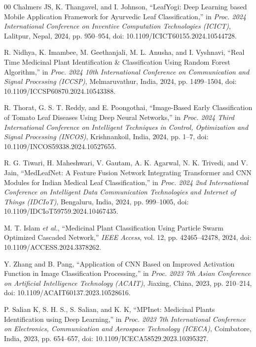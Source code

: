 \documentclass[conference]{IEEEtran}
\begin{document}
\begin{thebibliography}{00}
Chalmers JS, K. Thangavel, and I. Johnson, ``LeafYogi: Deep Learning based Mobile Application Framework for Ayurvedic Leaf Classification,'' in \textit{Proc. 2024 International Conference on Inventive Computation Technologies (ICICT)}, Lalitpur, Nepal, 2024, pp. 950--954, doi: 10.1109/ICICT60155.2024.10544728.

R. Nidhya, K. Imambee, M. Geethanjali, M. L. Anusha, and I. Vyshnavi, ``Real Time Medicinal Plant Identification \& Classification Using Random Forest Algorithm,'' in \textit{Proc. 2024 10th International Conference on Communication and Signal Processing (ICCSP)}, Melmaruvathur, India, 2024, pp. 1499--1504, doi: 10.1109/ICCSP60870.2024.10543388.

R. Thorat, G. S. T. Reddy, and E. Poongothai, ``Image-Based Early Classification of Tomato Leaf Diseases Using Deep Neural Networks,'' in \textit{Proc. 2024 Third International Conference on Intelligent Techniques in Control, Optimization and Signal Processing (INCOS)}, Krishnankoil, India, 2024, pp. 1--7, doi: 10.1109/INCOS59338.2024.10527655.

R. G. Tiwari, H. Maheshwari, V. Gautam, A. K. Agarwal, N. K. Trivedi, and V. Jain, ``MedLeafNet: A Feature Fusion Network Integrating Transformer and CNN Modules for Indian Medical Leaf Classification,'' in \textit{Proc. 2024 2nd International Conference on Intelligent Data Communication Technologies and Internet of Things (IDCIoT)}, Bengaluru, India, 2024, pp. 999--1005, doi: 10.1109/IDCIoT59759.2024.10467435.

M. T. Islam \textit{et al.}, ``Medicinal Plant Classification Using Particle Swarm Optimized Cascaded Network,'' \textit{IEEE Access}, vol. 12, pp. 42465--42478, 2024, doi: 10.1109/ACCESS.2024.3378262.

Y. Zhang and B. Pang, ``Application of CNN Based on Improved Activation Function in Image Classification Processing,'' in \textit{Proc. 2023 7th Asian Conference on Artificial Intelligence Technology (ACAIT)}, Jiaxing, China, 2023, pp. 210--214, doi: 10.1109/ACAIT60137.2023.10528616.

P. Salian K, S. H. S., S. Salian, and K. K, ``MPInet: Medicinal Plants Identification using Deep Learning,'' in \textit{Proc. 2023 7th International Conference on Electronics, Communication and Aerospace Technology (ICECA)}, Coimbatore, India, 2023, pp. 654--657, doi: 10.1109/ICECA58529.2023.10395327.


\end{thebibliography}
\end{document}
